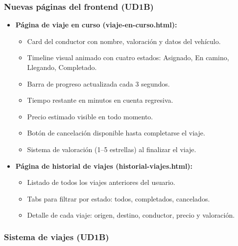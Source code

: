 \documentclass[12pt,a4paper]{article}
\begin{document}
\subsubsection{Nuevas páginas del frontend (UD1B)}

\begin{itemize}
    \item \textbf{Página de viaje en curso (viaje-en-curso.html):}
    \begin{itemize}
        \item Card del conductor con nombre, valoración y datos del vehículo.
        \item Timeline visual animado con cuatro estados: Asignado, En camino, Llegando, Completado.
        \item Barra de progreso actualizada cada 3 segundos.
        \item Tiempo restante en minutos en cuenta regresiva.
        \item Precio estimado visible en todo momento.
        \item Botón de cancelación disponible hasta completarse el viaje.
        \item Sistema de valoración (1--5 estrellas) al finalizar el viaje.
    \end{itemize}
    
    \item \textbf{Página de historial de viajes (historial-viajes.html):}
    \begin{itemize}
        \item Listado de todos los viajes anteriores del usuario.
        \item Tabs para filtrar por estado: todos, completados, cancelados.
        \item Detalle de cada viaje: origen, destino, conductor, precio y valoración.
    \end{itemize}
\end{itemize}

\subsubsection{Sistema de viajes (UD1B)}
\end{document}
